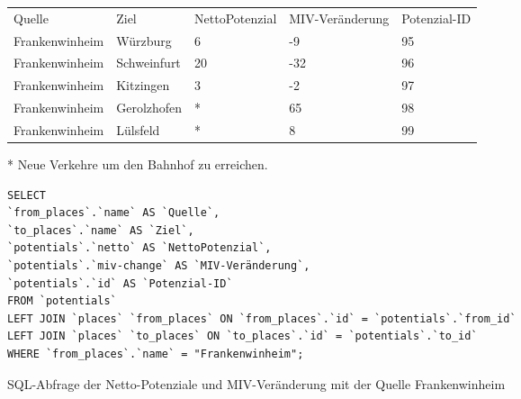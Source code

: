 \begin{tabular}{ l  l  l  l  l }
Quelle & Ziel & NettoPotenzial & MIV-Veränderung & Potenzial-ID\\ 
Frankenwinheim & Würzburg & 6 & -9 & 95\\ 
Frankenwinheim & Schweinfurt & 20 & -32 & 96\\ 
Frankenwinheim & Kitzingen & 3 & -2 & 97\\ 
Frankenwinheim & Gerolzhofen & * & 65 & 98\\ 
Frankenwinheim & Lülsfeld & * & 8 & 99\\ 
\end{tabular}    
\newline
\newline
* Neue Verkehre um den Bahnhof zu erreichen.
\newline
\begin{listing}[htbp]
\begin{verbatim}
SELECT
`from_places`.`name` AS `Quelle`, 
`to_places`.`name` AS `Ziel`, 
`potentials`.`netto` AS `NettoPotenzial`, 
`potentials`.`miv-change` AS `MIV-Veränderung`, 
`potentials`.`id` AS `Potenzial-ID`
FROM `potentials`
LEFT JOIN `places` `from_places` ON `from_places`.`id` = `potentials`.`from_id`
LEFT JOIN `places` `to_places` ON `to_places`.`id` = `potentials`.`to_id`
WHERE `from_places`.`name` = "Frankenwinheim";
\end{verbatim}
\caption{SQL-Abfrage der Netto-Potenziale und MIV-Veränderung mit der Quelle Frankenwinheim}\label{lst-fz-frankenwinheim}
\end{listing}